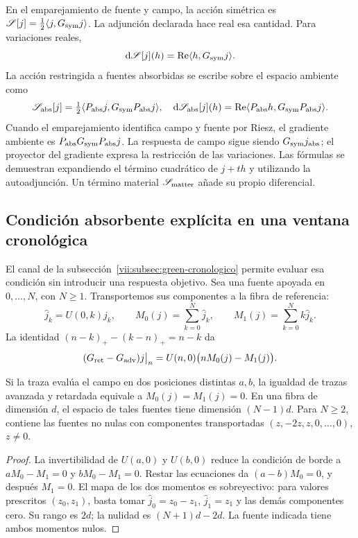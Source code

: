 En el emparejamiento de fuente y campo, la acción simétrica es
\(\mathscr S[j]=\tfrac12\langle j,G_{\rm sym}j\rangle\).
La adjunción declarada hace real esa cantidad. Para variaciones reales,
\[
 \mathrm d\mathscr S[j](h)
 =\operatorname{Re}\langle h,G_{\rm sym}j\rangle.
\]
La acción restringida a fuentes absorbidas se escribe sobre el espacio
ambiente como
\begin{equation}
 \mathscr S_{\rm abs}[j]
 =\tfrac12\langle P_{\rm abs}j,G_{\rm sym}P_{\rm abs}j\rangle,
 \quad
 \mathrm d\mathscr S_{\rm abs}[j](h)
 =\operatorname{Re}\langle P_{\rm abs}h,G_{\rm sym}P_{\rm abs}j\rangle.
 \label{vii:eq:variacion-restringida-absorcion}
\end{equation}
Cuando el emparejamiento identifica campo y fuente por Riesz, el gradiente
ambiente es \(P_{\rm abs}G_{\rm sym}P_{\rm abs}j\).
La respuesta de campo sigue siendo \(G_{\rm sym}j_{\rm abs}\); el
proyector del gradiente expresa la restricción de las variaciones.
Las fórmulas se demuestran expandiendo el término cuadrático de
\(j+th\) y utilizando la autoadjunción. Un término material
\(\mathscr S_{\rm matter}\) añade su propio diferencial.

\subsection{Condición absorbente explícita en una ventana cronológica}
\label{vii:subsec:absorcion-momentos}

El canal de la subsección~\ref{vii:subsec:green-cronologico} permite
evaluar esa condición sin introducir una respuesta objetivo. Sea una
fuente apoyada en \(0,\ldots,N\), con \(N\geq1\). Transportemos
sus componentes a la fibra de referencia:
\[
 \widehat j_k=U(0,k)j_k,\qquad
 M_0(j)=\sum_{k=0}^N\widehat j_k,\qquad
 M_1(j)=\sum_{k=0}^Nk\widehat j_k.
\]
La identidad \((n-k)_+-(k-n)_+=n-k\) da
\begin{equation}
 (G_{\rm ret}-G_{\rm adv})j\big|_n
 =U(n,0)\bigl(nM_0(j)-M_1(j)\bigr).
 \label{vii:eq:diferencia-green-momentos}
\end{equation}

\begin{proposition}
\label{vii:prop:absorcion-momentos}
Si la traza evalúa el campo en dos posiciones distintas \(a,b\),
la igualdad de trazas avanzada y retardada equivale a
\(M_0(j)=M_1(j)=0\). En una fibra de dimensión \(d\), el espacio
de tales fuentes tiene dimensión \((N-1)d\). Para \(N\geq2\),
contiene las fuentes no nulas con componentes transportadas
\((z,-2z,z,0,\ldots,0)\), \(z\neq0\).
\end{proposition}
\begin{proof}
La invertibilidad de \(U(a,0)\) y \(U(b,0)\) reduce la condición
de borde a \(aM_0-M_1=0\) y \(bM_0-M_1=0\).
Restar las ecuaciones da \((a-b)M_0=0\), y después \(M_1=0\).
El mapa de los dos momentos es sobreyectivo: para valores prescritos
\((z_0,z_1)\), basta tomar
\(\widehat j_0=z_0-z_1\), \(\widehat j_1=z_1\) y las demás
componentes cero. Su rango es \(2d\); la nulidad es
\((N+1)d-2d\). La fuente indicada tiene ambos momentos nulos.
\end{proof}

